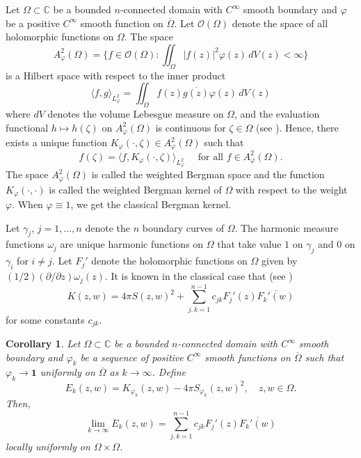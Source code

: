 \documentclass[11pt, reqno]{amsart}
\newtheorem{cor}[thm]{Corollary}
\numberwithin{equation}{section}
\newcommand{\ov}{\overline}
\begin{document}
\medskip

Let $\Omega\subset\mathbb{C}$ be a bounded $n$-connected domain with $C^{\infty}$ smooth boundary and $\varphi$ be a positive $C^{\infty}$ smooth function on $\overline{\Omega}$. Let $\mathcal{O}(\Omega)$ denote the space of all holomorphic functions on $\Omega$. The space
\[
A^2_{\varphi}(\Omega) = \{f\in \mathcal{O}(\Omega): \iint_{\Omega}\vert f(z)\vert^2 \varphi(z)\,dV(z) < \infty\}
\]
is a Hilbert space with respect to the inner product
\[
\langle f,g\rangle_{L^2_{\varphi}} = \iint_{\Omega} f(z) \ov{g(z)} \varphi(z) \, dV(z)
\]
where $dV$ denotes the volume Lebesgue measure on $\Omega$,
and the evaluation functional $h\mapsto h(\zeta)$ on $A^2_{\varphi}(\Omega)$ is continuous for $\zeta\in\Omega$ (see \cite{pw1, pw2}). Hence, there exists a unique function $K_{\varphi}(\cdot,\zeta)\in A^2_{\varphi}(\Omega)$ such that 
\[
f(\zeta) = \langle f, K_{\varphi}(\cdot,\zeta)\rangle_{L^2_{\varphi}} \quad \text{ for all }f\in A^2_{\varphi}(\Omega).
\]
The space $A^2_{\varphi}(\Omega)$ is called the weighted Bergman space and the function $K_{\varphi}(\cdot,\cdot)$ is called the weighted Bergman kernel of $\Omega$ with respect to the weight $\varphi$. When $\varphi \equiv 1$, we get the classical Bergman kernel.

\medskip

Let $\gamma_j$, $j=1,\ldots,n$ denote the $n$ boundary curves of $\Omega$. The harmonic measure functions $\omega_j$ are unique harmonic functions on $\Omega$ that take value $1$ on $\gamma_j$ and $0$ on $\gamma_i$ for $i\neq j$. Let $F_j'$ denote the holomorphic functions on $\Omega$ given by $(1/2)(\partial/\partial z)\omega_j(z)$.
It is known in the classical case that (see \cite{Be0})
\begin{equation}
K(z,w) = 4\pi S(z,w)^2 + \sum_{j,k=1}^{n-1} c_{jk} F_j'(z) \ov{F_k'(w)}
\end{equation}
for some constants $c_{jk}$.

\begin{cor}
Let $\Omega\subset\mathbb{C}$ be a bounded $n$-connected domain with $C^{\infty}$ smooth boundary and $\varphi_k$ be a sequence of positive $C^{\infty}$ smooth functions on $\ov\Omega$ such that $\varphi_k\rightarrow \mathbf{1}$ uniformly on $\ov\Omega$ as $k\rightarrow\infty$. Define
\[
E_k(z,w) = K_{\varphi_k}(z,w) - 4\pi S_{\varphi_k}(z,w)^2, \quad z,w\in\Omega.
\]
Then,
\[
\lim_{k\rightarrow\infty} E_k(z,w) = \sum_{j,k=1}^{n-1} c_{jk} F_j'(z) \ov{F_k'(w)}
\]
locally uniformly on $\Omega\times\Omega$.
\end{cor}
\end{document}

